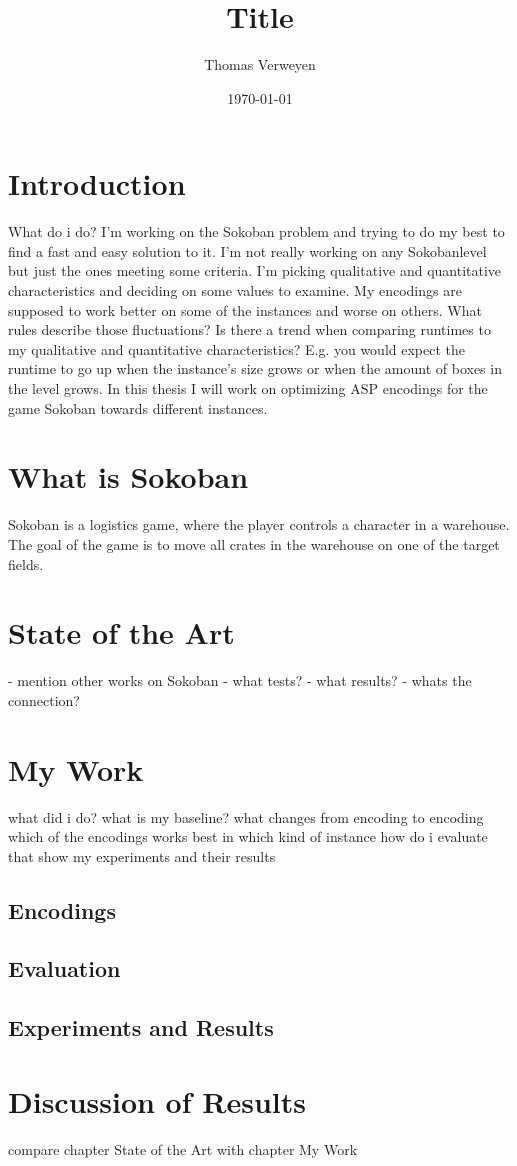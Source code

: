 \documentclass{report}
\title{Title}
\author{Thomas Verweyen}
\date{\today}
\begin{document}
\maketitle
\renewcommand*\contentsname{Summary}
\tableofcontents
\chapter{Introduction}
What do i do? I'm working on the Sokoban problem and trying to do my best to find a fast and easy solution to it. I'm not really working on any Sokobanlevel but just the ones meeting some criteria. I'm picking qualitative and quantitative characteristics and deciding on some values to examine. My encodings are supposed to work better on some of the instances and worse on others. What rules describe those fluctuations? Is there a trend when comparing runtimes to my qualitative and quantitative characteristics? E.g. you would expect the runtime to go up when the instance's size grows or when the amount of boxes in the level grows.
In this thesis I will work on optimizing ASP encodings for the game Sokoban towards different instances.
\chapter{What is Sokoban}
Sokoban is a logistics game, where the player controls a character in a warehouse. The goal of the game is to move all crates in the warehouse on one of the target fields.
\chapter{State of the Art}
- mention other works on Sokoban
- what tests?
- what results?
- whats the connection?
\chapter{My Work}
what did i do?
what is my baseline?
what changes from encoding to encoding
which of the encodings works best in which kind of instance
how do i evaluate that
show my experiments and their results
	\section{Encodings}
	\section{Evaluation}
	\section{Experiments and Results}
\chapter{Discussion of Results}
compare chapter State of the Art with chapter My Work
\end{document}
